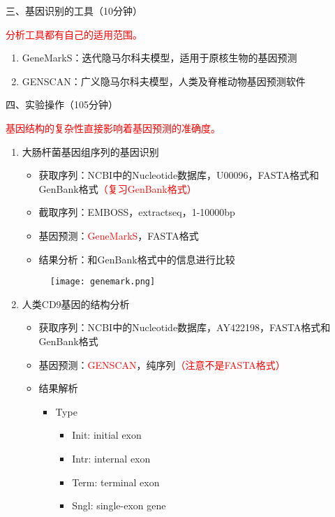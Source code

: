 \documentclass{TIJMUjiaoanSY}
\begin{document}
\vspace*{0.2cm}
\noindent
三、基因识别的工具（10分钟）

\textcolor{red}{分析工具都有自己的适用范围。}
\begin{enumerate}
  \item GeneMarkS：迭代隐马尔科夫模型，适用于原核生物的基因预测
  \item GENSCAN：广义隐马尔科夫模型，人类及脊椎动物基因预测软件
\end{enumerate}


\otherTail
\newpage
\otherHeader


\noindent
四、实验操作（105分钟）

\textcolor{red}{基因结构的复杂性直接影响着基因预测的准确度。}
\begin{enumerate}
  \item 大肠杆菌基因组序列的基因识别
    \begin{itemize}
      \item 获取序列：NCBI中的Nucleotide数据库，U00096，FASTA格式和GenBank格式\textcolor{red}{（复习GenBank格式）}
      \item 截取序列：EMBOSS，extractseq，1-10000bp
      \item 基因预测：\textcolor{red}{GeneMarkS}，FASTA格式
      \item 结果分析：和GenBank格式中的信息进行比较
    \end{itemize}
\begin{figure}[h]
  \centering
  \texttt{[image: genemark.png]}
\end{figure}
  \item 人类CD9基因的结构分析
    \begin{itemize}
      \item 获取序列：NCBI中的Nucleotide数据库，AY422198，FASTA格式和GenBank格式
      \item 基因预测：\textcolor{red}{GENSCAN}，纯序列\textcolor{red}{（注意不是FASTA格式）}
      \item 结果解析
        \begin{itemize}
          \item Type
            \begin{itemize}
              \item Init: initial exon
              \item Intr: internal exon
              \item Term: terminal exon
              \item Sngl: single-exon gene

\end{itemize}
\end{itemize}
\end{itemize}
\end{enumerate}
\end{document}

